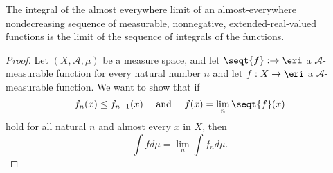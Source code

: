 \begin{prop}

The integral
of the almost everywhere limit
of an almost-everywhere nondecreasing sequence
of measurable, nonnegative,
extended-real-valued
functions is the
limit of the sequence
of integrals of the functions.

\begin{proof}

Let $(X, \mathcal{A}, \mu)$
be a measure space,
and let $\seqt{f}: \to \eri$
a $\mathcal{A}$-measurable function
for every natural number $n$
and let $f: X \to \eri$ a
$\mathcal{A}$-measurable function.
We want to show that if
\[
  f_n(x) \leq f_{n+1}(x)
  \quad
  \text{ and }
  \quad
  f(x) = \lim_n \seqt{f}(x)
\]
hold for all natural $n$ and
almost every $x$ in $X$,
then
\[
  \int f d\mu = \lim_n \int f_n d\mu.
\]

\end{proof}

\end{prop}
\strats
